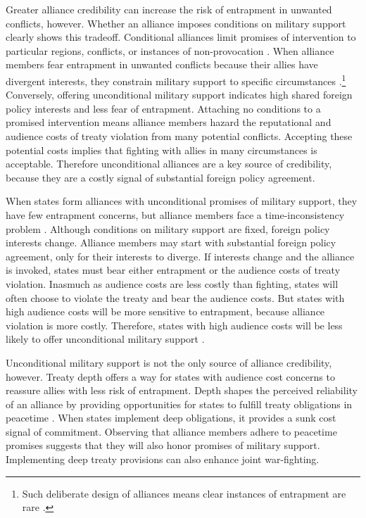 \documentclass[12pt]{article}
\begin{document}
Greater alliance credibility can increase the risk of entrapment in unwanted conflicts, however. 
Whether an alliance imposes conditions on military support clearly shows this tradeoff.
Conditional alliances limit promises of intervention to particular regions, conflicts, or instances of non-provocation \citep{Leedsetal2000}. 
When alliance members fear entrapment in unwanted conflicts because their allies have divergent interests, they constrain military support to specific circumstances \citep{Kim2011, Benson2012}.\footnote{Such deliberate design of alliances means clear instances of entrapment are rare \citep{Kim2011, Beckley2015}.} 
Conversely, offering unconditional military support indicates high shared foreign policy interests and less fear of entrapment. 
Attaching no conditions to a promised intervention means alliance members hazard the reputational \citep{Gibler2008, Crescenzietal2012} and audience \citep{Fearon1997} costs of treaty violation from many potential conflicts. 
Accepting these potential costs implies that fighting with allies in many circumstances is acceptable.
Therefore unconditional alliances are a key source of credibility, because they are a costly signal of substantial foreign policy agreement. 


When states form alliances with unconditional promises of military support, they have few entrapment concerns, but alliance members face a time-inconsistency problem \citep{LeedsSavun2007}. 
Although conditions on military support are fixed, foreign policy interests change. 
Alliance members may start with substantial foreign policy agreement, only for their interests to diverge.
If interests change and the alliance is invoked, states must bear either entrapment or the audience costs of treaty violation.
Inasmuch as audience costs are less costly than fighting, states will often choose to violate the treaty and bear the audience costs.   
But states with high audience costs will be more sensitive to entrapment, because alliance violation is more costly. 
Therefore, states with high audience costs will be less likely to offer unconditional military support  \citep{Chibaetal2015}. 


Unconditional military support is not the only source of alliance credibility, however. 
Treaty depth offers a way for states with audience cost concerns to reassure allies with less risk of entrapment. 
Depth shapes the perceived reliability of an alliance by providing opportunities for states to fulfill treaty obligations in peacetime \citep{Morrow1994}. 
When states implement deep obligations, it provides a sunk cost signal of commitment.
Observing that alliance members adhere to peacetime promises suggests that they will also honor promises of military support. 
Implementing deep treaty provisions can also enhance joint war-fighting.
\end{document}
